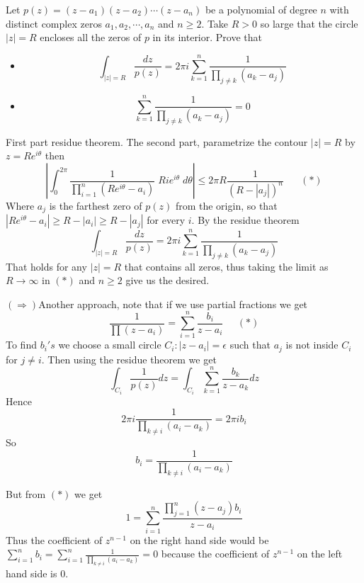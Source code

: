\begin{problem}
Let $p(z) = (z-a_1)(z-a_2)\cdots (z-a_n)$ be a polynomial of degree $n$ with distinct complex zeros $a_1,a_2,\cdots , a_n$ and $n\geq 2$. Take $R>0$ so large that the circle $|z|=R$ encloses all the zeros of $p$ in its interior. Prove that 
    \begin{itemize}
        \item [(a)] \[ \int_{|z|=R} \frac{dz}{p(z)} = 2\pi i \sum_{k=1}^n \frac{1}{\prod_{j\ne k} (a_k-a_j)}\]
        \item [(b)] 
        \[\sum_{k=1}^n \frac{1}{\prod_{j\ne k} (a_k-a_j)} = 0\]
    \end{itemize}
\begin{solution}
First part residue theorem. The second part, parametrize the contour $|z|=R$ by $z = Re^{i\theta}$ then 
\[\left|\int_0^{2\pi} \frac{1}{\prod_{i=1}^n (Re^{i\theta}-a_i)} \; Ri e^{i\theta}\; d\theta \right|\leq 2\pi R \frac{1}{(R-|a_j|)^n} \;\;\;\;\;\;(*)\]
Where $a_j$ is the farthest zero of $p(z)$ from the origin, so that $|Re^{i\theta}-a_i|\geq R-|a_i|\geq R-|a_j|$ for every $i$. By the residue theorem 
\[ \int_{|z|=R} \frac{dz}{p(z)} = 2\pi i \sum_{k=1}^n \frac{1}{\prod_{j\ne k} (a_k-a_j)}\]
That holds for any $|z|=R$ that contains all zeros, thus taking the limit as $R\to \infty$ in $(*)$ and $n\geq 2$ give us the desired. 

$(\Rightarrow )$Another approach, note that if we use partial fractions we get 
\[\frac{1}{\prod (z-a_i)} = \sum_{i=1}^n \frac{b_i}{z-a_i}\;\;\;\;\;(*)\]
To find $b_i's$ we choose a small circle $C_i:|z-a_i|=\epsilon$ such that $a_j$ is not inside $C_i$ for $j\ne i$. Then using the residue theorem we get 
\[ \int_{C_i} \frac{1}{p(z)} dz = \int_{C_i} \sum_{k=1}^n \frac{b_k}{z-a_k} dz \]
Hence 
\[ 2\pi i \frac{1}{\prod_{k\ne i} (a_i-a_k)} = 2\pi i b_i\]
So 
\[b_i = \frac{1}{\prod_{k\ne i }(a_i-a_k) } \]

But from $(*)$ we get 
\[1 = \sum_{i=1}^n \frac{\prod_{j=1}^n (z-a_j) b_i}{z-a_i}\]
Thus the coefficient of $z^{n-1}$ on the right hand side would be $\sum_{i=1}^n b_i = \sum_{i=1}^n \frac{1}{\prod_{k\ne i} (a_i - a_k)} =0$ because the coefficient of $z^{n-1}$ on the left hand side is $0$.
\end{solution}
\end{problem}


